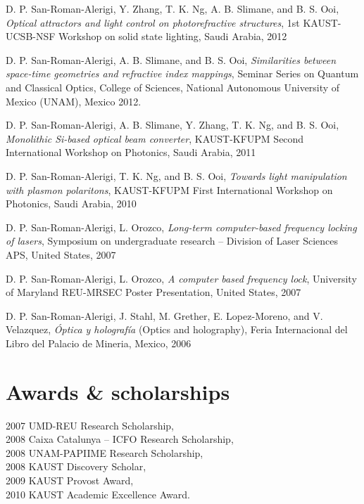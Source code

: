 \documentclass[margin,10pt]{res}
\newcommand{\UNAM}{National Autonomous University of Mexico (UNAM)}
\begin{document}
D. P. San-Roman-Alerigi, Y. Zhang, T. K. Ng, A. B. Slimane, and B. S. Ooi, \emph{Optical attractors and light control on photorefractive structures}, 1st KAUST-UCSB-NSF Workshop on solid state lighting, Saudi Arabia, 2012

D. P. San-Roman-Alerigi, A. B. Slimane, and B. S. Ooi, \emph{Similarities between space-time geometries and refractive index mappings}, Seminar Series on Quantum and Classical Optics, College of Sciences, \UNAM, Mexico 2012.

D. P. San-Roman-Alerigi, A. B. Slimane, Y. Zhang, T. K. Ng, and B. S. Ooi, \emph{Monolithic Si-based optical beam converter}, KAUST-KFUPM Second International Workshop on Photonics, Saudi Arabia, 2011

D. P. San-Roman-Alerigi, T. K. Ng, and B. S. Ooi, \emph{Towards light manipulation with plasmon polaritons}, KAUST-KFUPM First International Workshop on Photonics, Saudi Arabia, 2010

D. P. San-Roman-Alerigi, L. Orozco, \emph{Long-term computer-based frequency locking of lasers}, Symposium on undergraduate research -- Division of Laser Sciences APS, United States, 2007 

D. P. San-Roman-Alerigi, L. Orozco, \emph{A computer based frequency lock}, University of Maryland REU-MRSEC Poster Presentation, United States, 2007

D. P. San-Roman-Alerigi, J. Stahl, M. Grether, E. Lopez-Moreno, and V. Velazquez, \emph{\'Optica y holograf\'ia} (Optics and holography), Feria Internacional del Libro del Palacio de Mineria, Mexico, 2006


\section{Awards \& scholarships}

2007 UMD-REU Research Scholarship,\\ 
2008 Caixa Catalunya – ICFO Research Scholarship,\\ 
2008 UNAM-PAPIIME Research Scholarship,\\
2008 KAUST Discovery Scholar,\\
2009 KAUST Provost Award,\\
2010 KAUST Academic Excellence Award.\\

\end{document}
